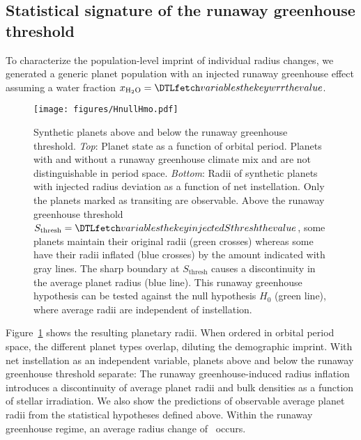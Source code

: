 \documentclass[twocolumn]{aastex631}
\begin{document}
\subsection{Statistical signature of the runaway greenhouse threshold}\label{sec:res_signature}
To characterize the population-level imprint of individual radius changes, we generated a generic planet population with an injected runaway greenhouse effect assuming a water fraction $x_\mathrm{H_2O} = \var{wrr}$.
\begin{figure}
    \begin{centering}
        \texttt{[image: figures/HnullHmo.pdf]}
        \caption{Synthetic planets above and below the runaway greenhouse threshold.
        \textit{Top}: Planet state as a function of orbital period. Planets with and without a runaway greenhouse climate mix and are not distinguishable in period space.
        \textit{Bottom}: Radii of synthetic planets with injected radius deviation as a function of net instellation. Only the planets marked as transiting are observable.
            Above the runaway greenhouse threshold $S_\mathrm{thresh} = \var{injectedSthresh}$, some planets maintain their original radii (green crosses) whereas some have their radii inflated (blue crosses) by the amount indicated with gray lines.
        The sharp boundary at $S_\mathrm{thresh}$ causes a discontinuity in the average planet radius (blue line).
            This runaway greenhouse hypothesis can be tested against the null hypothesis $H_0$ (green line), where average radii are independent of instellation.}
        \label{fig:HnullHmo}
    \end{centering}
\end{figure}
Figure~\ref{fig:HnullHmo} shows the resulting planetary radii.
When ordered in orbital period space, the different planet types overlap, diluting the demographic imprint.
With net instellation as an independent variable, planets above and below the runaway greenhouse threshold separate: The runaway greenhouse-induced radius inflation introduces a discontinuity of average planet radii and bulk densities as a function of stellar irradiation.
We also show the predictions of observable average planet radii from the statistical hypotheses defined above.
Within the runaway greenhouse regime, an average radius change of \avgRadiusChange\ occurs.
\end{document}
